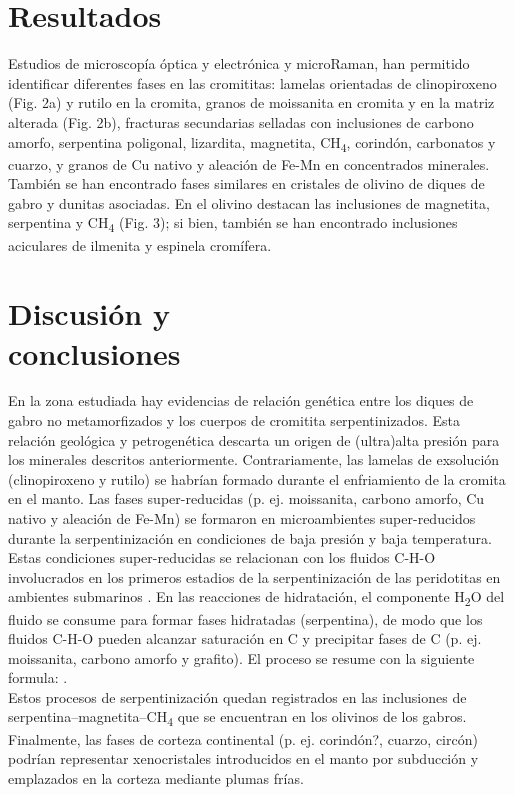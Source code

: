 \documentclass[a4paper,11pt]{article}
\begin{document}
\begin{multicols}{2}
		\section{Resultados}
		Estudios de microscopía óptica y electrónica y microRaman, han permitido identificar diferentes fases en las cromititas: lamelas orientadas de clinopiroxeno (Fig. 2a) y rutilo en la cromita, granos de moissanita en cromita y en la matriz alterada (Fig. 2b), fracturas secundarias selladas con inclusiones de carbono amorfo, serpentina poligonal, lizardita, magnetita, CH\textsubscript{4}, corindón, carbonatos y cuarzo, y granos de Cu nativo y aleación de Fe-Mn en concentrados minerales. 
		También se han encontrado fases similares en cristales de olivino de diques de gabro y dunitas asociadas. En el olivino destacan las inclusiones de magnetita, serpentina y CH\textsubscript{4} (Fig. 3); si bien, también se han encontrado inclusiones aciculares de ilmenita y espinela cromífera.
		
		
		\section{Discusión y \\conclusiones}
		En la zona estudiada hay evidencias de relación genética entre los diques de gabro no metamorfizados y los cuerpos de cromitita serpentinizados. Esta relación geológica y petrogenética descarta un origen de (ultra)alta presión para los minerales descritos anteriormente. Contrariamente, las lamelas de exsolución (clinopiroxeno y rutilo) se habrían formado durante el enfriamiento de la cromita en el manto. Las fases super-reducidas (p. ej. moissanita, carbono amorfo, Cu nativo y aleación de Fe-Mn) se formaron en microambientes super-reducidos durante la serpentinización en condiciones de baja presión y baja temperatura. Estas condiciones super-reducidas se relacionan con los fluidos C-H-O involucrados en los primeros estadios de la serpentinización de las peridotitas en ambientes submarinos \cite{Golubkova}. En las reacciones de hidratación, el componente H\textsubscript{2}O del fluido se consume para formar fases hidratadas (serpentina), de modo que los fluidos C-H-O pueden alcanzar saturación en C y precipitar fases de C (p. ej. moissanita, carbono amorfo y grafito). El proceso se resume con la siguiente formula:
		 \cite{Golubkova}.
		\\Estos procesos de serpentinización quedan registrados en las inclusiones de serpentina–magnetita–CH\textsubscript{4} que se encuentran en los olivinos de los gabros. Finalmente, las fases de corteza continental (p. ej. corindón?, cuarzo, circón) podrían representar xenocristales introducidos en el manto por subducción y emplazados en la corteza mediante plumas frías.
	\end{multicols}
	
	
	
	
\end{document}
